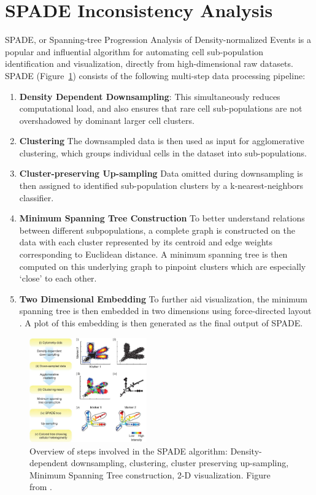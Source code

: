 \documentclass{article}
\begin{document}
\section{SPADE Inconsistency Analysis}
\label{sec:spade}
SPADE, or Spanning-tree Progression Analysis of Density-normalized Events \cite{} is a popular and influential algorithm for automating cell sub-population identification and visualization, directly from high-dimensional raw datasets. SPADE  (Figure~\ref{fig:spade_overview}) consists of the following multi-step data processing pipeline:

\begin{enumerate}
\item \textbf{Density Dependent Downsampling}: This simultaneously reduces computational load, and also ensures that rare cell sub-populations are not overshadowed by dominant larger cell clusters. 

\item \textbf{Clustering} The downsampled data is then used as input for agglomerative clustering, which groups individual cells in the dataset into sub-populations. 

\item \textbf{Cluster-preserving Up-sampling} Data omitted during downsampling is then assigned to identified sub-population clusters by a k-nearest-neighbors classifier.

\item \textbf{Minimum Spanning Tree Construction} To better understand relations between different subpopulations, a complete graph is constructed on the data with each cluster represented by its centroid and edge weights corresponding to Euclidean distance.  A minimum spanning tree is then computed on this underlying graph to pinpoint clusters which are especially ‘close’ to each other.
 
\item \textbf{Two Dimensional Embedding} To further aid visualization, the minimum spanning tree is then embedded in two dimensions using force-directed layout \cite{}. A plot of this embedding is then generated as the final output of SPADE.
\end{enumerate}

\begin{figure}
\begin{center}
\includegraphics[width=0.45\textwidth]{Figures/SPADE-flowchart.jpg}
\end{center}
\caption{Overview of steps involved in the SPADE algorithm: Density-dependent downsampling, clustering, cluster preserving up-sampling, Minimum Spanning Tree construction, 2-D visualization.  Figure from \cite{}. }
\label{fig:spade_overview}
\end{figure}
\end{document}
